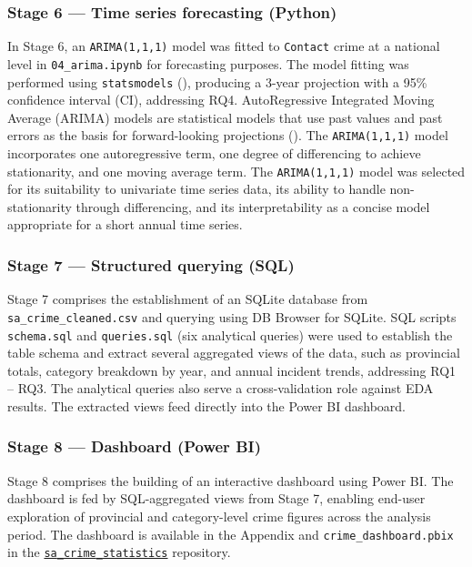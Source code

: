 \documentclass[titlepage, 12pt, oneside]{article}
\numberwithin{equation}{section}
\begin{document}
    \subsubsection*{Stage 6 --- Time series forecasting (Python)} \label{stage6}
    In Stage 6, an \texttt{ARIMA(1,1,1)} model was fitted to \texttt{Contact} crime at a national level in \texttt{04{\_}arima.ipynb} for forecasting purposes. The model fitting was performed using \texttt{statsmodels} (\cite{seabold2010}), producing a 3-year projection with a 95\% confidence interval (CI), addressing RQ4. AutoRegressive Integrated Moving Average (ARIMA) models are statistical models that use past values and past errors as the basis for forward-looking projections (\cite{box2015}). The \texttt{ARIMA(1,1,1)} model incorporates one autoregressive term, one degree of differencing to achieve stationarity, and one moving average term. The \texttt{ARIMA(1,1,1)} model was selected for its suitability to univariate time series data, its ability to handle non-stationarity through differencing, and its interpretability as a concise model appropriate for a short annual time series.
   
    \subsubsection*{Stage 7 --- Structured querying (SQL)} \label{stage7}
    Stage 7 comprises the establishment of an SQLite database from \texttt{sa{\_}crime{\_}cleaned.csv} and querying using DB Browser for SQLite. SQL scripts \texttt{schema.sql} and \texttt{queries.sql} (six analytical queries) were used to establish the table schema and extract several aggregated views of the data, such as provincial totals, category breakdown by year, and annual incident trends, addressing RQ1 -- RQ3. The analytical queries also serve a cross-validation role against EDA results. The extracted views feed directly into the Power BI dashboard.    
    
    \subsubsection*{Stage 8 --- Dashboard (Power BI)}  \label{stage8}
    Stage 8 comprises the building of an interactive dashboard using Power BI. The dashboard is fed by SQL-aggregated views from Stage 7, enabling end-user exploration of provincial and category-level crime figures across the analysis period. The dashboard is available in the Appendix and \texttt{crime{\_}dashboard.pbix} in the \href{https://github.com/joshua-pillay/sa-crime-statistics}{\texttt{sa{\_}crime{\_}statistics}} repository. 
	
\end{document}
